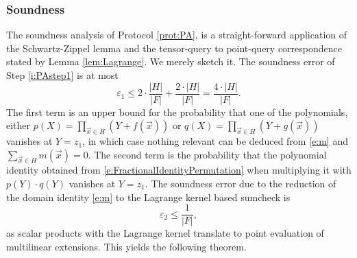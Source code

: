 \documentclass[11pt]{article}
\theoremstyle{definition}
\theoremstyle{remark}
\begin{document}
\subsubsection{Soundness}
\label{s:PASoundness}

The soundness analysis of Protocol \ref{prot:PA}, is a straight-forward application of the Schwartz-Zippel lemma and the tensor-query to point-query correspondence stated by Lemma \ref{lem:Lagrange}.
We merely sketch it.
The soundness error of Step \ref{i:PAstep1} is at most 
\begin{equation*}
\varepsilon_1 \leq 2\cdot\frac{ |H|}{|F|} + \frac{2\cdot |H|}{|F|} = \frac{4\cdot |H|}{|F|}.
\end{equation*}
The first term is an upper bound for the probability that one of the polynomials, either
$p(X)=\prod_{\vec x\in H} (Y + f(\vec x))$ 
or 
$q(X)= \prod_{\vec x\in H} (Y + g(\vec x))$ 
vanishes at $Y=z_1$, in which case nothing relevant can be deduced from \eqref{e:m} and $\sum_{\vec x\in H} m(\vec x)=0$.
The second term is the probability that the polynomial identity obtained from \eqref{e:FractionalIdentityPermutation} when multiplying it with $p(Y)\cdot q(Y)$ vanishes at $Y = z_1$.
The soundness error due to the reduction of the domain identity  \eqref{e:m}  to the Lagrange kernel based sumcheck is 
\[
\varepsilon_2 \leq \frac{1}{|F|},
\]
as scalar products with the Lagrange kernel translate to point evaluation of multilinear extensions.
This yields the following theorem. 
\end{document}
